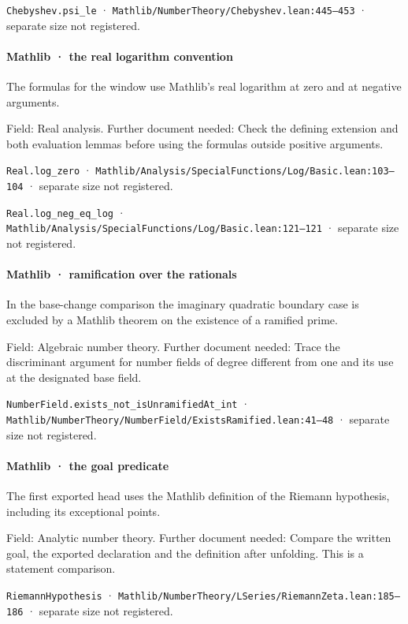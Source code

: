 \nolinkurl{Chebyshev.psi_le} · \nolinkurl{Mathlib/NumberTheory/Chebyshev.lean:445–453} · separate size not registered.

\paragraph{Mathlib · the real logarithm convention}

The formulas for the window use Mathlib’s real logarithm at zero and at negative arguments.

Field: Real analysis. Further document needed: Check the defining extension and both evaluation lemmas before using the formulas outside positive arguments.

\nolinkurl{Real.log_zero} · \nolinkurl{Mathlib/Analysis/SpecialFunctions/Log/Basic.lean:103–104} · separate size not registered.

\nolinkurl{Real.log_neg_eq_log} · \nolinkurl{Mathlib/Analysis/SpecialFunctions/Log/Basic.lean:121–121} · separate size not registered.

\paragraph{Mathlib · ramification over the rationals}

In the base-change comparison the imaginary quadratic boundary case is excluded by a Mathlib theorem on the existence of a ramified prime.

Field: Algebraic number theory. Further document needed: Trace the discriminant argument for number fields of degree different from one and its use at the designated base field.

\nolinkurl{NumberField.exists_not_isUnramifiedAt_int} · \nolinkurl{Mathlib/NumberTheory/NumberField/ExistsRamified.lean:41–48} · separate size not registered.

\paragraph{Mathlib · the goal predicate}

The first exported head uses the Mathlib definition of the Riemann hypothesis, including its exceptional points.

Field: Analytic number theory. Further document needed: Compare the written goal, the exported declaration and the definition after unfolding. This is a statement comparison.

\nolinkurl{RiemannHypothesis} · \nolinkurl{Mathlib/NumberTheory/LSeries/RiemannZeta.lean:185–186} · separate size not registered.

\noindent{}
